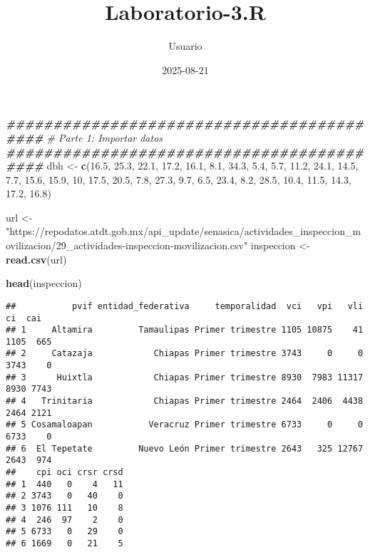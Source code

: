 \documentclass[
]{article}
\title{Laboratorio-3.R}
\author{Usuario}
\date{2025-08-21}
\newenvironment{Shaded}{\begin{snugshade}}{\end{snugshade}}
\newcommand{\CommentTok}[1]{\textcolor[rgb]{0.56,0.35,0.01}{\textit{#1}}}
\newcommand{\DecValTok}[1]{\textcolor[rgb]{0.00,0.00,0.81}{#1}}
\newcommand{\DocumentationTok}[1]{\textcolor[rgb]{0.56,0.35,0.01}{\textbf{\textit{#1}}}}
\newcommand{\FloatTok}[1]{\textcolor[rgb]{0.00,0.00,0.81}{#1}}
\newcommand{\FunctionTok}[1]{\textcolor[rgb]{0.13,0.29,0.53}{\textbf{#1}}}
\newcommand{\NormalTok}[1]{#1}
\newcommand{\OtherTok}[1]{\textcolor[rgb]{0.56,0.35,0.01}{#1}}
\newcommand{\StringTok}[1]{\textcolor[rgb]{0.31,0.60,0.02}{#1}}
\begin{document}
\maketitle

\begin{Shaded}
\begin{Highlighting}[]
\DocumentationTok{\#\#\#\#\#\#\#\#\#\#\#\#\#\#\#\#\#\#\#\#\#\#\#\#\#\#\#\#\#\#\#\#\#\#\#\#\#\#\#\#\#\#}
\CommentTok{\# Parte 1: Importar datos}
\DocumentationTok{\#\#\#\#\#\#\#\#\#\#\#\#\#\#\#\#\#\#\#\#\#\#\#\#\#\#\#\#\#\#\#\#\#\#\#\#\#\#\#\#\#\#}
\NormalTok{dbh }\OtherTok{\textless{}{-}} \FunctionTok{c}\NormalTok{(}\FloatTok{16.5}\NormalTok{, }\FloatTok{25.3}\NormalTok{, }\FloatTok{22.1}\NormalTok{, }\FloatTok{17.2}\NormalTok{, }\FloatTok{16.1}\NormalTok{, }\FloatTok{8.1}\NormalTok{, }\FloatTok{34.3}\NormalTok{,}
         \FloatTok{5.4}\NormalTok{, }\FloatTok{5.7}\NormalTok{, }\FloatTok{11.2}\NormalTok{, }\FloatTok{24.1}\NormalTok{, }\FloatTok{14.5}\NormalTok{, }\FloatTok{7.7}\NormalTok{, }\FloatTok{15.6}\NormalTok{, }\FloatTok{15.9}\NormalTok{,}
         \DecValTok{10}\NormalTok{, }\FloatTok{17.5}\NormalTok{, }\FloatTok{20.5}\NormalTok{, }\FloatTok{7.8}\NormalTok{, }\FloatTok{27.3}\NormalTok{, }\FloatTok{9.7}\NormalTok{, }\FloatTok{6.5}\NormalTok{, }\FloatTok{23.4}\NormalTok{,}
         \FloatTok{8.2}\NormalTok{, }\FloatTok{28.5}\NormalTok{, }\FloatTok{10.4}\NormalTok{, }\FloatTok{11.5}\NormalTok{, }\FloatTok{14.3}\NormalTok{, }\FloatTok{17.2}\NormalTok{, }\FloatTok{16.8}\NormalTok{)}

\NormalTok{url }\OtherTok{\textless{}{-}}\StringTok{"https://repodatos.atdt.gob.mx/api\_update/senasica/actividades\_inspeccion\_movilizacion/29\_actividades{-}inspeccion{-}movilizacion.csv"}
\NormalTok{inspeccion }\OtherTok{\textless{}{-}}\FunctionTok{read.csv}\NormalTok{(url) }

\FunctionTok{head}\NormalTok{(inspeccion)}
\end{Highlighting}
\end{Shaded}

\begin{verbatim}
##           pvif entidad_federativa     temporalidad  vci   vpi   vli   ci  cai
## 1     Altamira         Tamaulipas Primer trimestre 1105 10875    41 1105  665
## 2     Catazaja            Chiapas Primer trimestre 3743     0     0 3743    0
## 3      Huixtla            Chiapas Primer trimestre 8930  7983 11317 8930 7743
## 4   Trinitaria            Chiapas Primer trimestre 2464  2406  4438 2464 2121
## 5 Cosamaloapan           Veracruz Primer trimestre 6733     0     0 6733    0
## 6  El Tepetate         Nuevo León Primer trimestre 2643   325 12767 2643  974
##    cpi oci crsr crsd
## 1  440   0    4   11
## 2 3743   0   40    0
## 3 1076 111   10    8
## 4  246  97    2    0
## 5 6733   0   29    0
## 6 1669   0   21    5
\end{verbatim}
\end{document}
